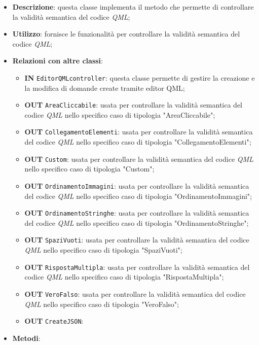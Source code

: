 \begin{itemize}
	\item \textbf{Descrizione}: questa classe implementa il metodo che permette di controllare la validità semantica del codice \textit{QML};
	\item \textbf{Utilizzo}: fornisce le funzionalità per controllare la validità semantica del codice \textit{QML};
	\item \textbf{Relazioni con altre classi}:
	\begin{itemize}
		\item \textbf{IN} \texttt{EditorQMLcontroller}: questa classe permette di gestire la creazione e la modifica di domande create tramite editor QML;		
		\item \textbf{OUT} \texttt{AreaCliccabile}: usata per controllare la validità semantica del codice \textit{QML} nello specifico caso di tipologia "AreaCliccabile";
		\item \textbf{OUT} \texttt{CollegamentoElementi}: usata per controllare la validità semantica del codice \textit{QML} nello specifico caso di tipologia "CollegamentoElementi";
		\item \textbf{OUT} \texttt{Custom}: usata per controllare la validità semantica del codice \textit{QML} nello specifico caso di tipologia "Custom";
		\item \textbf{OUT} \texttt{OrdinamentoImmagini}: usata per controllare la validità semantica del codice \textit{QML} nello specifico caso di tipologia "OrdinamentoImmagini";
		\item \textbf{OUT} \texttt{OrdinamentoStringhe}: usata per controllare la validità semantica del codice \textit{QML} nello specifico caso di tipologia "OrdinamentoStringhe";
		\item \textbf{OUT} \texttt{SpaziVuoti}: usata per controllare la validità semantica del codice \textit{QML} nello specifico caso di tipologia "SpaziVuoti";
		\item \textbf{OUT} \texttt{RispostaMultipla}: usata per controllare la validità semantica del codice \textit{QML} nello specifico caso di tipologia "RispostaMultipla";
		\item \textbf{OUT} \texttt{VeroFalso}: usata per controllare la validità semantica del codice \textit{QML} nello specifico caso di tipologia "VeroFalso";
		\item \textbf{OUT} \texttt{CreateJSON}:
	\end{itemize}
	\item \textbf{Metodi}:

\end{itemize}
